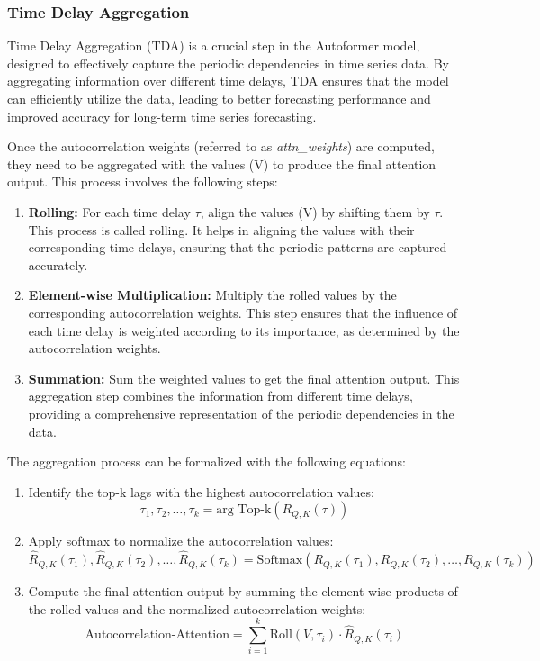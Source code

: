 \subsubsection{Time Delay Aggregation}
Time Delay Aggregation (TDA) is a crucial step in the Autoformer model, designed to effectively capture the periodic dependencies in time series data. By aggregating information over different time delays, TDA ensures that the model can efficiently utilize the data, leading to better forecasting performance and improved accuracy for long-term time series forecasting.

Once the autocorrelation weights (referred to as \textit{attn\_weights}) are computed, they need to be aggregated with the values (V) to produce the final attention output. This process involves the following steps:

\begin{enumerate}
    \item \textbf{Rolling:} For each time delay \( \tau \), align the values (V) by shifting them by \( \tau \). This process is called rolling. It helps in aligning the values with their corresponding time delays, ensuring that the periodic patterns are captured accurately.
    \item \textbf{Element-wise Multiplication:} Multiply the rolled values by the corresponding autocorrelation weights. This step ensures that the influence of each time delay is weighted according to its importance, as determined by the autocorrelation weights.
    \item \textbf{Summation:} Sum the weighted values to get the final attention output. This aggregation step combines the information from different time delays, providing a comprehensive representation of the periodic dependencies in the data.
\end{enumerate}

The aggregation process can be formalized with the following equations:

\begin{enumerate}
    \item Identify the top-k lags with the highest autocorrelation values:
    \[
    \tau_1, \tau_2, \ldots, \tau_k = \text{arg Top-k}(R_{Q,K}(\tau))
    \]
    \item Apply softmax to normalize the autocorrelation values:
    \[
    \hat{R}_{Q,K}(\tau_1), \hat{R}_{Q,K}(\tau_2), \ldots, \hat{R}_{Q,K}(\tau_k) = \text{Softmax}(R_{Q,K}(\tau_1), R_{Q,K}(\tau_2), \ldots, R_{Q,K}(\tau_k))
    \]
    \item Compute the final attention output by summing the element-wise products of the rolled values and the normalized autocorrelation weights:
    \[
    \text{Autocorrelation-Attention} = \sum_{i=1}^{k} \text{Roll}(V, \tau_i) \cdot \hat{R}_{Q,K}(\tau_i)
    \]
\end{enumerate}

